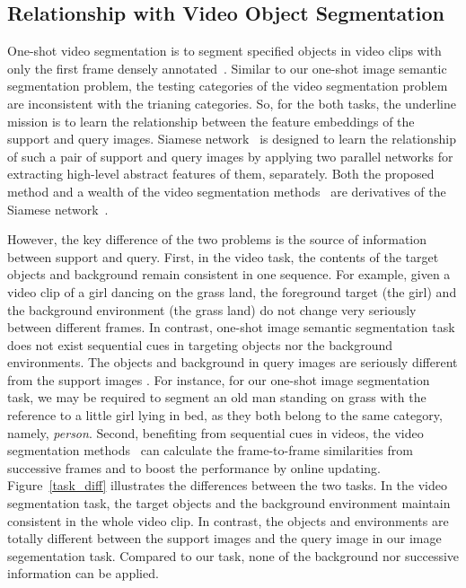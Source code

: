 \documentclass[journal]{IEEEtran}
\begin{document}
\subsection{Relationship with Video Object Segmentation}
One-shot video segmentation is to segment specified objects in video clips with only the first frame densely annotated~\cite{davis2017}.
Similar to our one-shot image semantic segmentation problem, the testing categories of the video segmentation problem are inconsistent with the trianing categories.
So, for the both tasks, the underline mission is to learn the relationship between the feature embeddings of the support and query images.
Siamese network~\cite{koch2015siamese} is designed to learn the relationship of such a pair of support and query images by applying two parallel networks for extracting high-level abstract features of them, separately.
Both the proposed method and a wealth of the video segmentation methods~\cite{hu2018videomatch, shin2017pixel,oh2018fast} are derivatives of the Siamese network~\cite{koch2015siamese}. 


However, the key difference of the two problems is the source of information between support and query. 
First, in the video task, the contents of the target objects and background remain consistent in one sequence.
For example, given a video clip of a girl dancing on the grass land, the foreground target (the girl) and the background environment (the grass land) do not change very seriously between different frames.
In contrast, one-shot image semantic segmentation task does not exist sequential cues in targeting objects nor the background environments. 
The objects and background in query images are seriously different from the support images . 
For instance, for our one-shot image segmentation task, we may be required to segment an old man standing on grass with the reference to a little girl lying in bed, as they both belong to the same category, namely, \textit{person}.
Second, benefiting from sequential cues in videos,  the video segmentation methods~\cite{hu2018videomatch} can calculate the frame-to-frame similarities from successive frames and to boost the performance by online updating.
Figure~\ref{task_diff} illustrates the differences between the two tasks.
In the video segmentation task, the target objects and the background environment maintain consistent in the whole video clip.
In contrast, the objects and environments are totally different between the support images and the query image in our image segementation task. 
Compared to our task, none of the background nor successive information can be applied.
\end{document}
